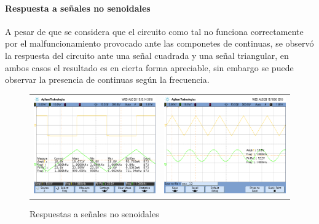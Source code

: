 \paragraph*{Respuesta a se\~nales no senoidales} A pesar de que se considera que el circuito como tal no funciona correctamente por el malfuncionamiento provocado ante las componetes de continuas,
se observ\'o la respuesta del circuito ante una se\~nal cuadrada y una se\~nal triangular, en ambos casos el resultado es en cierta forma apreciable, sin embargo se puede observar la presencia de continuas
seg\'un la frecuencia.

\begin{figure}[H]
	\centering
	\begin{tabular}{c c}
		\includegraphics[scale=0.2]{../EJ4/Integrador/Mediciones/Osciloscopio/PCB_Sin_Compensar/osc_11.png} & 
		\includegraphics[scale=0.2]{../EJ4/Integrador/Mediciones/Osciloscopio/PCB_Sin_Compensar/osc_12.png}
	\end{tabular}
	\caption{Respuestas a se\~nales no senoidales}
	\label{fig:integrador_respuestas}
\end{figure}

